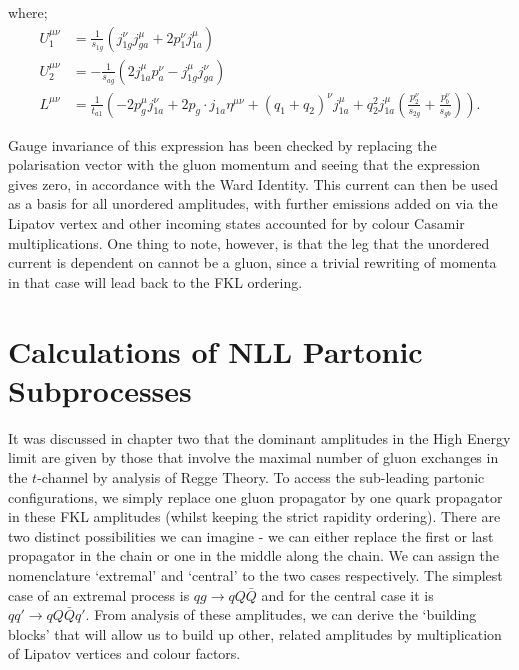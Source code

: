 where;
\begin{equation}
\begin{split}
U_1^{\mu \nu} &= \frac{1}{s_{1g}}(j^\nu_{1g}j^\mu_{ga} + 2 p_1^\nu j^\mu_{1a}) \\
U_2^{\mu \nu} &= -\frac{1}{s_{ag}}(2j^\mu_{1a}p_a^\nu - j^\mu_{1g}j^\nu_{ga}) \\
L^{\mu \nu} &= \frac{1}{t_{a1}} \left(-2p^\mu_g j^\nu_{1a} + 2 p_g \cdot j_{1a}\eta^{\mu \nu} + (q_1 + q_2)^\nu j^{\mu}_{1a} + q_2^2 j^\mu_{1a} \left(\frac{p_2^\nu}{s_{2g}} + \frac{p_b^\nu}{s_{gb}} \right) \right).
\end{split}
\end{equation}




Gauge invariance of this expression has been checked by replacing the polarisation vector with the gluon momentum and seeing that the expression gives zero, in accordance with the Ward Identity. This current can then be used as a basis for all unordered amplitudes, with further emissions added on via the Lipatov vertex and other incoming states accounted for by colour Casamir multiplications. One thing to note, however, is that the leg that the unordered current is dependent on cannot be a gluon, since a trivial rewriting of momenta in that case will lead back to the FKL ordering. 

\section{Calculations of NLL Partonic Subprocesses}

It was discussed in chapter two that the dominant amplitudes in the High Energy limit are given by those that involve the maximal number of gluon exchanges in the $t$-channel by analysis of Regge Theory. To access the sub-leading partonic configurations, we simply replace one gluon propagator by one quark propagator in these FKL amplitudes (whilst keeping the strict rapidity ordering). There are two distinct possibilities we can imagine - we can either replace the first or last propagator in the chain or one in the middle along the chain. We can assign the nomenclature `extremal' and `central' to the two cases respectively. The simplest case of an extremal process is $qg \to qQ\bar{Q}$ and for the central case it is $qq' \to qQ\bar{Q}q'$. From analysis of these amplitudes, we can derive the `building blocks' that will allow us to build up other, related amplitudes by multiplication of Lipatov vertices and colour factors. 

